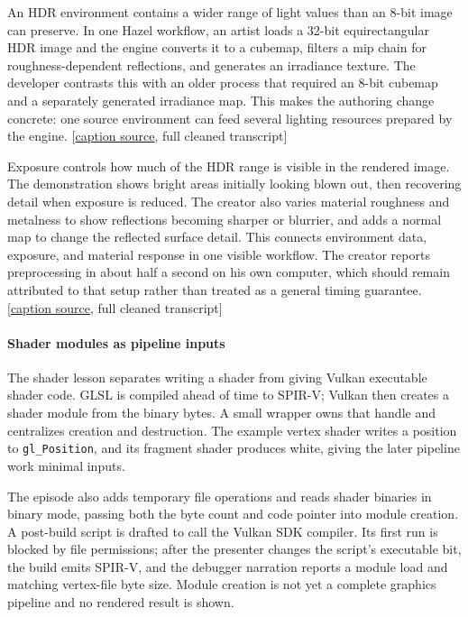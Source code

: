 An HDR environment contains a wider range of light values than an 8-bit image can preserve. In one Hazel workflow, an artist loads a 32-bit equirectangular HDR image and the engine converts it to a cubemap, filters a mip chain for roughness-dependent reflections, and generates an irradiance texture. The developer contrasts this with an older process that required an 8-bit cubemap and a separately generated irradiance map. This makes the authoring change concrete: one source environment can feed several lighting resources prepared by the engine. {[}\href{https://www.youtube.com/watch?v=mzJ60W8I_bk}{caption source}, full cleaned transcript{]}

Exposure controls how much of the HDR range is visible in the rendered image. The demonstration shows bright areas initially looking blown out, then recovering detail when exposure is reduced. The creator also varies material roughness and metalness to show reflections becoming sharper or blurrier, and adds a normal map to change the reflected surface detail. This connects environment data, exposure, and material response in one visible workflow. The creator reports preprocessing in about half a second on his own computer, which should remain attributed to that setup rather than treated as a general timing guarantee. {[}\href{https://www.youtube.com/watch?v=mzJ60W8I_bk}{caption source}, full cleaned transcript{]}

\paragraph{Shader modules as pipeline inputs}\label{shader-modules-as-pipeline-inputs}

The shader lesson separates writing a shader from giving Vulkan executable shader code. GLSL is compiled ahead of time to SPIR-V; Vulkan then creates a shader module from the binary bytes. A small wrapper owns that handle and centralizes creation and destruction. The example vertex shader writes a position to \texttt{gl\_Position}, and its fragment shader produces white, giving the later pipeline work minimal inputs.

The episode also adds temporary file operations and reads shader binaries in binary mode, passing both the byte count and code pointer into module creation. A post-build script is drafted to call the Vulkan SDK compiler. Its first run is blocked by file permissions; after the presenter changes the script's executable bit, the build emits SPIR-V, and the debugger narration reports a module load and matching vertex-file byte size. Module creation is not yet a complete graphics pipeline and no rendered result is shown.


